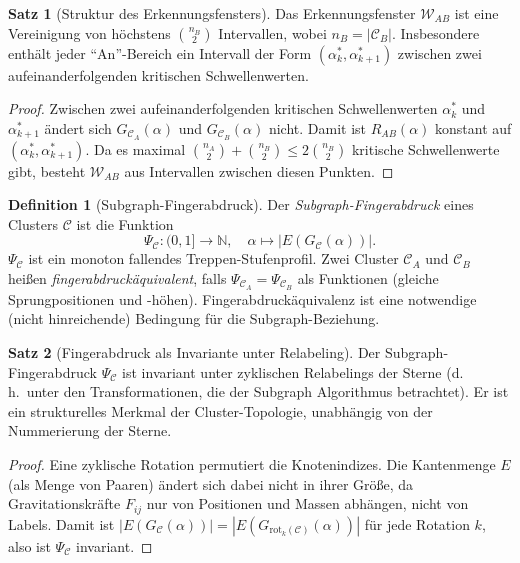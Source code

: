 ﻿\documentclass[a4paper,12pt]{report}
\theoremstyle{definition}
\newtheorem{definition}{Definition}
\newtheorem{satz}{Satz}
\begin{document}
\begin{satz}[Struktur des Erkennungsfensters]
\label{satz:fensterstruktur}
Das Erkennungsfenster $\mathcal{W}_{AB}$ ist eine Vereinigung von höchstens $\binom{n_B}{2}$ Intervallen, wobei $n_B = |\mathcal{C}_B|$. Insbesondere enthält jeder ``An''-Bereich ein Intervall der Form $(\alpha^*_k, \alpha^*_{k+1})$ zwischen zwei aufeinanderfolgenden kritischen Schwellenwerten.
\end{satz}

\begin{proof}
Zwischen zwei aufeinanderfolgenden kritischen Schwellenwerten $\alpha^*_k$ und $\alpha^*_{k+1}$ ändert sich $G_{\mathcal{C}_A}(\alpha)$ und $G_{\mathcal{C}_B}(\alpha)$ nicht. Damit ist $R_{AB}(\alpha)$ konstant auf $(\alpha^*_k, \alpha^*_{k+1})$. Da es maximal $\binom{n_A}{2} + \binom{n_B}{2} \leq 2\binom{n_B}{2}$ kritische Schwellenwerte gibt, besteht $\mathcal{W}_{AB}$ aus Intervallen zwischen diesen Punkten.
\end{proof}

\begin{definition}[Subgraph-Fingerabdruck]
\label{def:fingerabdruck}
Der \emph{Subgraph-Fingerabdruck} eines Clusters $\mathcal{C}$ ist die Funktion
\[
\Psi_\mathcal{C}: (0,1] \to \mathbb{N}, \quad \alpha \mapsto |E(G_\mathcal{C}(\alpha))|.
\]
$\Psi_\mathcal{C}$ ist ein monoton fallendes Treppen-Stufenprofil. Zwei Cluster $\mathcal{C}_A$ und $\mathcal{C}_B$ heißen \emph{fingerabdruckäquivalent}, falls $\Psi_{\mathcal{C}_A} = \Psi_{\mathcal{C}_B}$ als Funktionen (gleiche Sprungpositionen und -höhen). Fingerabdruckäquivalenz ist eine notwendige (nicht hinreichende) Bedingung für die Subgraph-Beziehung.
\end{definition}

\begin{satz}[Fingerabdruck als Invariante unter Relabeling]
\label{satz:fingerabdruck_invariant}
Der Subgraph-Fingerabdruck $\Psi_\mathcal{C}$ ist invariant unter zyklischen Relabelings der Sterne (d.\,h.\ unter den Transformationen, die der Subgraph Algorithmus betrachtet). Er ist ein strukturelles Merkmal der Cluster-Topologie, unabhängig von der Nummerierung der Sterne.
\end{satz}

\begin{proof}
Eine zyklische Rotation permutiert die Knotenindizes. Die Kantenmenge $E$ (als Menge von Paaren) ändert sich dabei nicht in ihrer Größe, da Gravitations\-kräfte $F_{ij}$ nur von Positionen und Massen abhängen, nicht von Labels. Damit ist $|E(G_\mathcal{C}(\alpha))| = |E(G_{\mathrm{rot}_k(\mathcal{C})}(\alpha))|$ für jede Rotation $k$, also ist $\Psi_\mathcal{C}$ invariant.
\end{proof}
\end{document}
